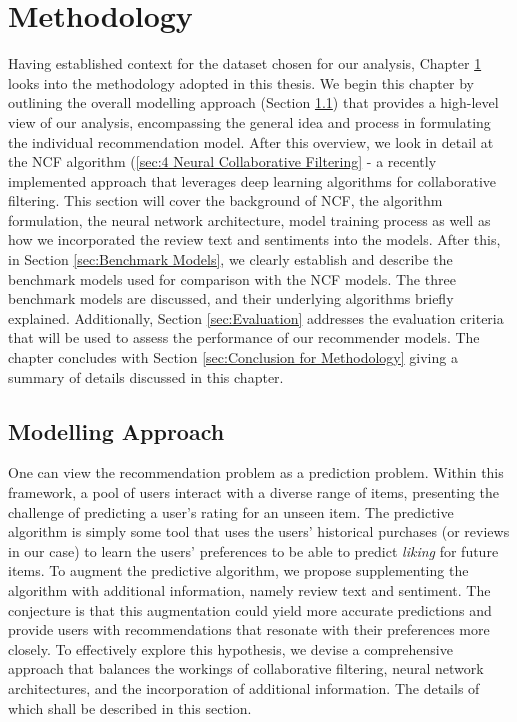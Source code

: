 \chapter{Methodology} %
\label{Chapter4}

Having established context for the dataset chosen for our analysis, Chapter \ref{Chapter4} looks into the methodology adopted in this thesis. We begin this chapter by outlining the overall modelling approach (Section \ref{sec:4 Modelling Approach}) that provides a high-level view of our analysis, encompassing the general idea and process in formulating the individual recommendation model. After this overview, we look in detail at the NCF algorithm (\ref{sec:4 Neural Collaborative Filtering} - a recently implemented approach that leverages deep learning algorithms for collaborative filtering. This section will cover the background of NCF, the algorithm formulation, the neural network architecture, model training process as well as how we incorporated the review text and sentiments into the models. After this, in Section \ref{sec:Benchmark Models}, we clearly establish and describe the benchmark models used for comparison with the NCF models. The three benchmark models are discussed, and their underlying algorithms briefly explained. Additionally, Section \ref{sec:Evaluation} addresses the evaluation criteria that will be used to assess the performance of our recommender models. The chapter concludes with Section \ref{sec:Conclusion for Methodology} giving a summary of details discussed in this chapter.

\section{Modelling Approach}
\label{sec:4 Modelling Approach}

One can view the recommendation problem as a prediction problem. Within this framework, a pool of users interact with a diverse range of items, presenting the challenge of predicting a user's rating for an unseen item. The predictive algorithm is simply some tool that uses the users’ historical purchases (or reviews in our case) to learn the users’ preferences to be able to predict \textit{liking} for future items. To augment the predictive algorithm, we propose supplementing the algorithm with additional information, namely review text and sentiment. The conjecture is that this augmentation could yield more accurate predictions and provide users with recommendations that resonate with their preferences more closely. To effectively explore this hypothesis, we devise a comprehensive approach that balances the workings of collaborative filtering, neural network architectures, and the incorporation of additional information. The details of which shall be described in this section.

